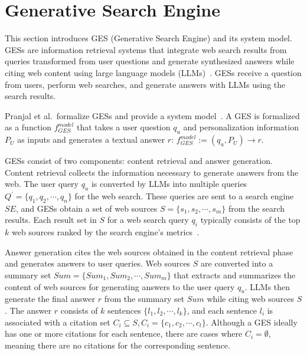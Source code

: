 \section{Generative Search Engine}
\label{sec:generative_engine}
This section introduces GES (Generative Search Engine) and its system model.
GESs are information retrieval systems that integrate web search results from queries transformed from user questions and generate synthesized answers while citing web content using large language models (LLMs)~\cite{geo-apmr+24}.
GESs receive a question from users, perform web searches, and generate answers with LLMs using the search results.

Pranjal et al.\ formalize GESs and provide a system model~\cite{geo-apmr+24}.
A GES is formalized as a function \( f_{GES}^{model} \) that takes a user question \( q_u \) and personalization information \( P_U \) as inputs and generates a textual answer \( r \):
$ f_{GES}^{model} := (q_u, P_U) \rightarrow r $.

GESs consist of two components: content retrieval and answer generation.
Content retrieval collects the information necessary to generate answers from the web.
The user query \( q_u \) is converted by LLMs into multiple queries \( Q^{\prime} = \{q_1, q_2, \cdots, q_n\} \) for the web search.
These queries are sent to a search engine \( SE \), and GESs obtain a set of web sources \( S = \{s_1, s_2, \cdots, s_m\} \) from the search results.
Each result set in $S$ for a web search query \( q_i \) typically consists of the top \( k \) web sources ranked by the search engine's metrics~\cite{poisonedrag-arxiv24, modern-information-retrieval-a-brief-overview-3320, geo-apmr+24}.

Answer generation cites the web sources obtained in the content retrieval phase and generates answers to user queries.
Web sources \( S \) are converted into a summary set \( Sum = \{Sum_1, Sum_2, \cdots, Sum_m\} \) that extracts and summarizes the content of web sources for generating answers to the user query \( q_u \).
LLMs then generate the final answer \( r \) from the summary set \( Sum \) while citing web sources \( S \).
The answer \( r \) consists of \( k \) sentences \( \{l_1, l_2, \cdots, l_k\} \), and each sentence \( l_i \) is associated with a citation set \( C_i \subseteq S, C_i = \{c_1, c_2, \cdots, c_l\} \).
Although a GES ideally has one or more citations for each sentence, there are cases where \( C_i = \emptyset \), meaning there are no citations for the corresponding sentence.

